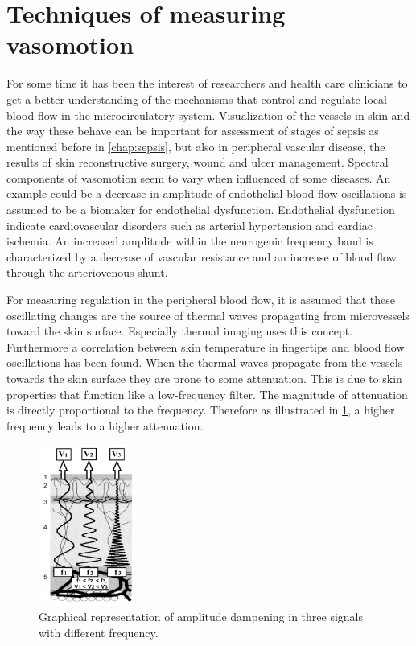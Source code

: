 \section{Techniques of measuring vasomotion} \label{freq}

For some time it has been the interest of researchers and health care clinicians to get a better understanding of the mechanisms that control and regulate local blood flow in the microcirculatory system\cite{sagaidachnyi2014,sagaidachnyi2017,geyer2004,liu2012}. 
Visualization of the vessels in skin and the way these behave can be important for assessment of stages of sepsis as mentioned before in \cref{chap:sepsis}, but also in peripheral vascular disease, the results of skin reconstructive surgery, wound and ulcer management.\cite{liu2012,kanta2014}
Spectral components of vasomotion seem to vary when influenced of some diseases. An example could be a decrease in amplitude of endothelial blood flow oscillations is assumed to be a biomaker for endothelial dysfunction. Endothelial dysfunction indicate cardiovascular disorders such as arterial hypertension and cardiac ischemia. An increased amplitude within the neurogenic frequency band is characterized by a decrease of vascular resistance and an increase of blood flow through the arteriovenous shunt.\cite{sagaidachnyi2017}

For measuring regulation in the peripheral blood flow, it is assumed that these oscillating changes are the source of thermal waves propagating from microvessels toward the skin surface. Especially thermal imaging uses this concept.\cite{sagaidachnyi2017}
Furthermore a correlation between skin temperature in fingertips and blood flow oscillations has been found\cite{sagaidachnyi2014}.
When the thermal waves propagate from the vessels towards the skin surface they are prone to some attenuation. This is due to skin properties that function like a low-frequency filter.\cite{podtaev2008}
The magnitude of attenuation is directly proportional to the frequency.
Therefore as illustrated in \cref{fig:atten}, a higher frequency leads to a higher attenuation.   

\begin{figure}[H]
	\centering	\includegraphics[width=0.28\textwidth]{figures/attenuation}
	\caption{Graphical representation of amplitude dampening in three signals with different frequency.\cite{sagaidachnyi2014}}
	\label{fig:atten}
\end{figure} \vspace{-.3cm}

